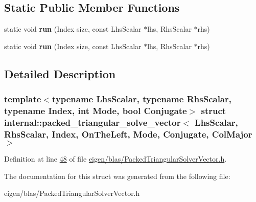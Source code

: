 \subsection*{Static Public Member Functions}
\begin{DoxyCompactItemize}
\item 
\mbox{\label{structinternal_1_1packed__triangular__solve__vector_3_01_lhs_scalar_00_01_rhs_scalar_00_01_index28b9bd679eec74694b1e600413bff835_ae15bb9e68ea29715d12bc0273e5fc3f3}} 
static void {\bfseries run} (Index size, const Lhs\+Scalar $\ast$lhs, Rhs\+Scalar $\ast$rhs)
\item 
\mbox{\label{structinternal_1_1packed__triangular__solve__vector_3_01_lhs_scalar_00_01_rhs_scalar_00_01_index28b9bd679eec74694b1e600413bff835_ae15bb9e68ea29715d12bc0273e5fc3f3}} 
static void {\bfseries run} (Index size, const Lhs\+Scalar $\ast$lhs, Rhs\+Scalar $\ast$rhs)
\end{DoxyCompactItemize}


\subsection{Detailed Description}
\subsubsection*{template$<$typename Lhs\+Scalar, typename Rhs\+Scalar, typename Index, int Mode, bool Conjugate$>$\newline
struct internal\+::packed\+\_\+triangular\+\_\+solve\+\_\+vector$<$ Lhs\+Scalar, Rhs\+Scalar, Index, On\+The\+Left, Mode, Conjugate, Col\+Major $>$}



Definition at line \hyperlink{eigen_2blas_2_packed_triangular_solver_vector_8h_source_l00048}{48} of file \hyperlink{eigen_2blas_2_packed_triangular_solver_vector_8h_source}{eigen/blas/\+Packed\+Triangular\+Solver\+Vector.\+h}.



The documentation for this struct was generated from the following file\+:\begin{DoxyCompactItemize}
\item 
eigen/blas/\+Packed\+Triangular\+Solver\+Vector.\+h\end{DoxyCompactItemize}
